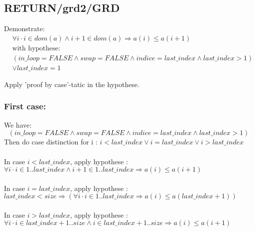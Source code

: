 \subsection{RETURN/grd2/GRD}
Demonstrate:
\begin{align*}
&\forall i \cdot i \in dom(a) \land i+1 \in dom(a) \Rightarrow a(i) \leq a(i+1) \\
&\text{with hypothese: } \\
&(in\_loop=FALSE \land swap=FALSE \land indice=last\_index \land last\_index>1) \\
&\lor last\_index=1
\end{align*}

Apply 'proof by case'-tatic in the hypothese.

\subsubsection{First case: }
We have:
$$
(in\_loop=FALSE \land swap=FALSE \land indice=last\_index \land last\_index>1)
$$
Then do case distinction for i : $i < last\_index \lor i = last\_index \lor i > last\_index$
\paragraph{}
In case $i < last\_index$, apply hypothese : \\
$
\forall i \cdot i \in 1..last\_index \land i+1 \in 1..last\_index \Rightarrow a(i) \leq a(i+1)
$

\paragraph{}
In case $i = last\_index$, apply hypothese :\\
$
last\_index < size \Rightarrow (\forall i \cdot i \in 1..last\_index \Rightarrow a(i) \leq a(last\_index+1))
$

\paragraph{}
In case $i > last\_index$, apply hypothese :\\
$
\forall i \cdot i \in last\_index+1..size \land i \in last\_index+1..size \Rightarrow a(i) \leq a(i+1)
$





















